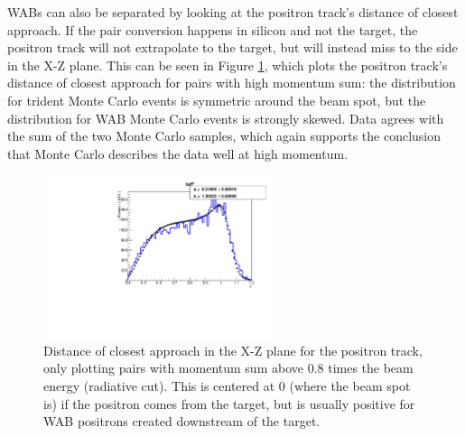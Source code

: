 WABs can also be separated by looking at the positron track's distance of closest approach.
If the pair conversion happens in silicon and not the target, the positron track will not extrapolate to the target, but will instead miss to the side in the X-Z plane.
This can be seen in Figure \ref{fig:pos_d0}, which plots the positron track's distance of closest approach for pairs with high momentum sum: the distribution for trident Monte Carlo events is symmetric around the beam spot, but the distribution for WAB Monte Carlo events is strongly skewed.
Data agrees with the sum of the two Monte Carlo samples, which again supports the conclusion that Monte Carlo describes the data well at high momentum.

\begin{figure}[ht]
\begin{center}
    \includegraphics[width=0.6\textwidth,page=8,angle=-90]{recon/figs/wabratioplots}
\end{center}
    \caption{Distance of closest approach in the X-Z plane for the positron track, only plotting pairs with momentum sum above 0.8 times the beam energy (radiative cut).
    This is centered at 0 (where the beam spot is) if the positron comes from the target, but is usually positive for WAB positrons created downstream of the target.
    }
    \label{fig:pos_d0}
\end{figure}

